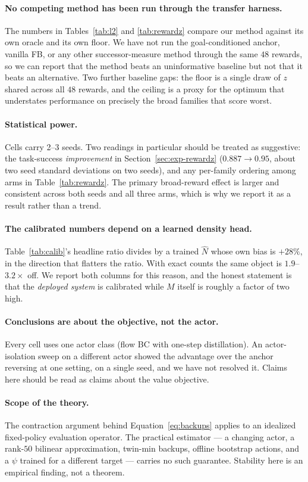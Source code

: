 \paragraph{No competing method has been run through the transfer harness.}
The numbers in Tables~\ref{tab:l2} and \ref{tab:rewardz} compare our method
against its own oracle and its own floor. We have not run the goal-conditioned
anchor, vanilla FB, or any other successor-measure method through the same $48$
rewards, so we can report that the method beats an uninformative baseline but not
that it beats an alternative. Two further baseline gaps: the floor is a single
draw of $z$ shared across all $48$ rewards, and the ceiling is a proxy for the
optimum that understates performance on precisely the broad families that score
worst.

\paragraph{Statistical power.}
Cells carry 2--3 seeds. Two readings in particular should be treated as
suggestive: the task-success \emph{improvement} in Section~\ref{sec:exp-rewardz}
($0.887\to0.95$, about two seed standard deviations on two seeds), and any
per-family ordering among arms in Table~\ref{tab:rewardz}. The primary
broad-reward effect is larger and consistent across both seeds and all three arms,
which is why we report it as a result rather than a trend.

\paragraph{The calibrated numbers depend on a learned density head.}
Table~\ref{tab:calib}'s headline ratio divides by a trained $\hat N$ whose own
bias is $+28\%$, in the direction that flatters the ratio. With exact counts the
same object is $1.9$--$3.2\times$ off. We report both columns for this reason, and
the honest statement is that the \emph{deployed system} is calibrated while
$M$ itself is roughly a factor of two high.

\paragraph{Conclusions are about the objective, not the actor.}
Every cell uses one actor class (flow BC with one-step distillation). An
actor-isolation sweep on a different actor showed the advantage over the anchor
reversing at one setting, on a single seed, and we have not resolved it. Claims
here should be read as claims about the value objective.

\paragraph{Scope of the theory.}
The contraction argument behind Equation~\ref{eq:backups} applies to an idealized
fixed-policy evaluation operator. The practical estimator --- a changing actor, a
rank-$50$ bilinear approximation, twin-min backups, offline bootstrap actions, and
a $\psi$ trained for a different target --- carries no such guarantee. Stability
here is an empirical finding, not a theorem.
